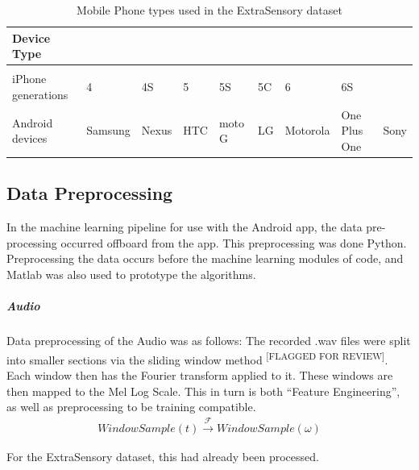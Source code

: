 \documentclass{UoNMCHA}
\newcommand{\flagforreview}{\textsuperscript{\color{red} [FLAGGED FOR REVIEW]}}
\newcommand{\inlineQuote}[1]{``#1''}
\numberwithin{equation}{section}
\begin{document}
\begin{table}[]    
    \begin{center}
        \caption{Mobile Phone types used in the ExtraSensory dataset}\label{tab:ExtraSensoryPhones}
        \begin{tabular}{lllllllll}
            \hline \hline 
            Device Type         &         &        &    &         &    &         &              &      \\
            \hline                                                                                     \\
            iPhone generations  & 4       & 4S    & 5   & 5S     & 5C & 6        & 6S           &      \\
            Android devices     & Samsung & Nexus & HTC & moto G & LG & Motorola & One Plus One & Sony \\
            \hline 
        \end{tabular}
    \end{center}
\end{table}


\subsection{Data Preprocessing}
In the machine learning pipeline for use with the Android app, the data pre-processing occurred offboard from the app. This preprocessing was done Python. Preprocessing the data occurs before the machine learning modules of code, and Matlab was also used to prototype the algorithms.

\subparagraph{Audio}
Data preprocessing of the Audio was as follows:
The recorded .wav files were split into smaller sections via the sliding window method\flagforreview. Each window then has the Fourier transform applied to it. These windows are then mapped to the Mel Log Scale. 
 This in turn is both \inlineQuote{Feature Engineering}, as well as preprocessing to be training compatible. 
\begin{gather}%
    WindowSample(t) \xrightarrow{\mathscr{F}}  WindowSample(\omega)
\end{gather}



For the ExtraSensory dataset, this had already been processed.
\end{document}
